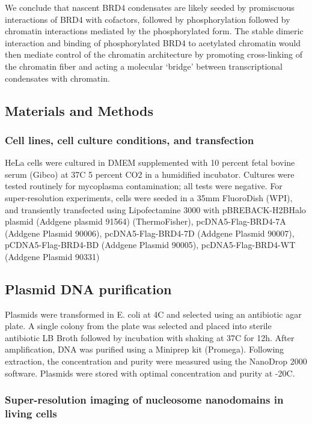 We conclude that nascent BRD4 condensates are likely seeded by promiscuous interactions of BRD4 with cofactors, followed by phosphorylation followed by chromatin interactions mediated by the phosphorylated form. The stable dimeric interaction and binding of phosphorylated BRD4 to acetylated chromatin would then mediate control of the chromatin architecture by promoting cross-linking of the chromatin fiber and acting a molecular ‘bridge’ between transcriptional condensates with chromatin. 



\subsection{Materials and Methods}

\subsubsection{Cell lines, cell culture conditions, and transfection}

HeLa cells were cultured in DMEM supplemented with 10 percent fetal bovine serum (Gibco) at 37C 5 percent CO2 in a humidified incubator. Cultures were tested routinely for mycoplasma contamination; all tests were negative. For super-resolution experiments, cells were seeded in a 35mm FluoroDish (WPI), and transiently transfected using Lipofectamine 3000 with pBREBACK-H2BHalo plasmid (Addgene plasmid 91564) (ThermoFisher), pcDNA5-Flag-BRD4-7A (Addgene Plasmid 90006), pcDNA5-Flag-BRD4-7D (Addgene Plasmid 90007), pCDNA5-Flag-BRD4-BD (Addgene Plasmid 90005), pcDNA5-Flag-BRD4-WT (Addgene Plasmid 90331)

\subsection{Plasmid DNA purification}

Plasmids were transformed in E. coli at 4C and selected using an antibiotic agar plate. A single colony from the plate was selected and placed into sterile antibiotic LB Broth followed by incubation with shaking at 37C for 12h. After amplification, DNA was purified using a Miniprep kit (Promega). Following extraction, the concentration and purity were measured using the NanoDrop 2000 software. Plasmids were stored with optimal concentration and purity at -20C.

\subsubsection{Super-resolution imaging of nucleosome nanodomains in living cells}

